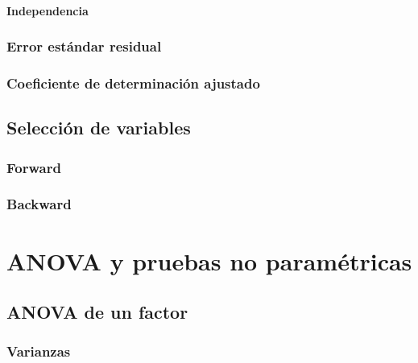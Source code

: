 \documentclass[
]{book}
\theoremstyle{definition}
\theoremstyle{definition}
\theoremstyle{definition}
\theoremstyle{definition}
\theoremstyle{remark}
\begin{document}
\hypertarget{independencia-1}{%
\subsubsection*{Independencia}\label{independencia-1}}

\hypertarget{error-estuxe1ndar-residual-1}{%
\subsection{Error estándar residual}\label{error-estuxe1ndar-residual-1}}

\hypertarget{coeficiente-de-determinaciuxf3n-ajustado}{%
\subsection{Coeficiente de determinación ajustado}\label{coeficiente-de-determinaciuxf3n-ajustado}}

\hypertarget{selecciuxf3n-de-variables}{%
\section{Selección de variables}\label{selecciuxf3n-de-variables}}

\hypertarget{forward}{%
\subsection{Forward}\label{forward}}

\hypertarget{backward}{%
\subsection{Backward}\label{backward}}

\hypertarget{anova-y-pruebas-no-paramuxe9tricas}{%
\chapter{ANOVA y pruebas no paramétricas}\label{anova-y-pruebas-no-paramuxe9tricas}}

\hypertarget{ANOVA1F}{%
\section{ANOVA de un factor}\label{ANOVA1F}}

\hypertarget{varianzas}{%
\subsection{Varianzas}\label{varianzas}}
\end{document}
